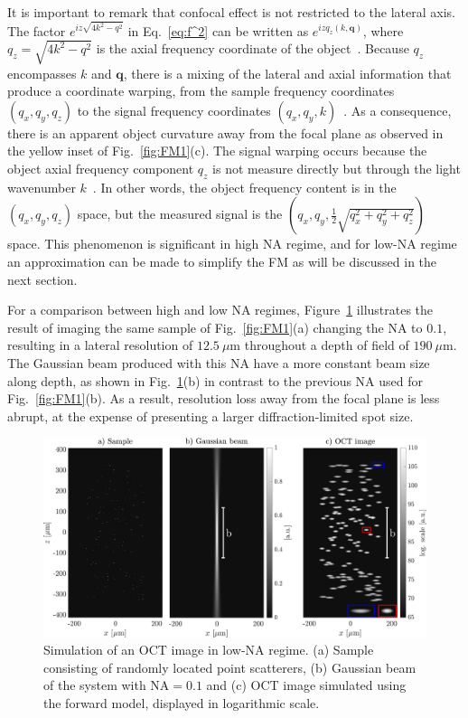 It is important to remark that confocal effect is not restricted to the lateral axis. The factor $e^{iz\sqrt{4k^2-q^2}}$ in Eq.~\eqref{eq:f^2} can be written as $e^{izq_z(k, \mathbf{q})}$, where $q_z=\sqrt{4k^2-q^2}$ is the axial frequency coordinate of the object~\cite{Davis2007_Nonparaxial}. Because $q_z$ encompasses $k$ and $\mathbf{q}$, there is a mixing of the lateral and axial information that produce a coordinate warping, from the sample frequency coordinates $(q_x, q_y, q_z)$ to the signal frequency coordinates $(q_x, q_y, k)$~\cite{Ralston2006_Inverse}. As a consequence, there is an apparent object curvature away from the focal plane as observed in the yellow inset of Fig.~\ref{fig:FM1}(c). The signal warping occurs because the object axial frequency component $q_z$ is not measure directly but through the light wavenumber $k$~\cite{Fercher2003_Optical}. In other words, the object frequency content is in the $(q_x, q_y, q_z)$ space, but the measured signal is the $(q_x, q_y, \frac{1}{2}\sqrt{q_x^2 + q_y^2 + q_z^2})$ space. This phenomenon is significant in high NA regime, and for low-NA regime an approximation can be made to simplify the FM as will be discussed in the next section.

For a comparison between high and low NA regimes, Figure~\ref{fig:FM2} illustrates the result of imaging the same sample of Fig.~\ref{fig:FM1}(a) changing the NA to $0.1$, resulting in a lateral resolution of $ 12.5~\mu$m throughout a depth of field of $190~\mu$m. The Gaussian beam produced with this NA have a more constant beam size along depth, as shown in Fig.~\ref{fig:FM2}(b) in contrast to the previous NA used for Fig.~\ref{fig:FM1}(b). As a result, resolution loss away from the focal plane is less abrupt, at the expense of presenting a larger diffraction-limited spot size.

\begin{figure}[htb!]
    \centering
    \includegraphics[width=\textwidth]{Figures/TheoreticalBasis/FM-LowNA.pdf}
    \caption{Simulation of an OCT image in low-NA regime. (a) Sample consisting of randomly located point scatterers, (b) Gaussian beam of the system with NA$=0.1$ and (c) OCT image simulated using the forward model, displayed in logarithmic scale.}
    \label{fig:FM2}
\end{figure}

